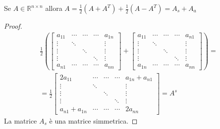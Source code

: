 \begin{exercise}[3.13a]
Se $A \in \mathbb{R}^{n \times n}$ allora $A = \frac{1}{2}(A + A^{T}) +
\frac{1}{2}(A - A^{T}) = A_{s} + A_{a}$
\end{exercise}
\begin{proof}
\begin{displaymath}
\begin{split}
\frac{1}{2}
\left (
\begin{bmatrix}
a_{11} & \cdots & \cdots &\cdots & a_{1n} \\
\vdots & \ddots &		&		& \vdots\\
\vdots &  		& \ddots & 		& \vdots\\
\vdots & 		&		& \ddots & \vdots\\
a_{n1} & \cdots & \cdots &\cdots & a_{nn}
\end{bmatrix} + 
\begin{bmatrix}
a_{11} & \cdots & \cdots &\cdots & a_{n1} \\
\vdots & \ddots &		&		& \vdots\\
\vdots &  		& \ddots & 		& \vdots\\
\vdots & 		&		& \ddots & \vdots\\
a_{1n} & \cdots & \cdots &\cdots & a_{nn}
\end{bmatrix} \right ) = \\
= \frac{1}{2} 
\begin{bmatrix}
2a_{11} & \cdots & \cdots &\cdots & a_{1n} + a_{n1} \\
\vdots & \ddots &		&		& \vdots\\
\vdots &  		& \ddots & 		& \vdots\\
\vdots & 		&		& \ddots & \vdots\\
a_{n1} + a_{1n} & \cdots & \cdots &\cdots & 2a_{nn}
\end{bmatrix} = A^{s}
\end{split}
\end{displaymath}
La matrice $A_{s}$ \`e una matrice simmetrica.


\end{proof}
